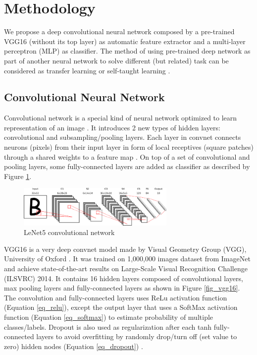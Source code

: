 \documentclass[conference, compsoc]{IEEEtran}
\begin{document}
\section{Methodology}

We propose a deep convolutional neural network composed by a pre-trained VGG16 (without its top layer) as automatic feature extractor and a multi-layer perceptron (MLP) as classifier. The method of using pre-trained deep network as part of another neural network to solve different (but related) task can be considered as transfer learning or self-taught learning \cite{raina2007self}.

\subsection{Convolutional Neural Network}

Convolutional network is a special kind of neural network optimized to learn representation of an image \cite{lecun2015deep}. It introduces 2 new types of hidden layers: convolutional and subsampling/pooling layers. Each layer in convnet connects neurons (pixels) from their input layer in form of local receptives (square patches) through a shared weights to a feature map \cite{lecun1998gradient}. On top of a set of convolutional and pooling layers, some fully-connected layers are added as classifier as described by Figure \ref{fig_lenet5_convnet}.

\begin{figure}[h]
	\begin{center}
		\includegraphics[width=3.0in]{../lenet5}
		\renewcommand{\figurename}{Fig.}		
		\caption{LeNet5 convolutional network}
		\label{fig_lenet5_convnet}
	\end{center}
\end{figure}


VGG16 is a very deep convnet model made by Visual Geometry Group (VGG), University of Oxford \cite{simonyan2014very}. It was trained on 1,000,000 images dataset from ImageNet and achieve state-of-the-art results on Large-Scale Visual Recognition Challenge (ILSVRC) 2014. It contains 16 hidden layers composed of convolutional layers, max pooling layers and fully-connected layers as shown in Figure \ref{fig_vgg16}. The convolution and fully-connected layers uses ReLu activation function (Equation \ref{eq_relu}), except the output layer that uses a SoftMax activation function (Equation \ref{eq_softmax}) to estimate probability of multiple classes/labels. Dropout is also used as regularization after each tanh fully-connected layers to avoid overfitting by randomly drop/turn off (set value to zero) hidden nodes (Equation \ref{eq_dropout}) \cite{srivastava2014dropout}.
\end{document}
